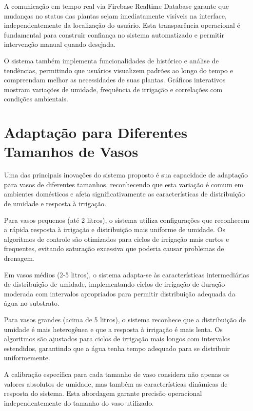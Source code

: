 \documentclass[twoside,english,brazilian]{UNISINOSmonografia}
\begin{document}
A comunicação em tempo real via Firebase Realtime Database garante que mudanças no status das plantas sejam imediatamente visíveis na interface, independentemente da localização do usuário. Esta transparência operacional é fundamental para construir confiança no sistema automatizado e permitir intervenção manual quando desejada.

O sistema também implementa funcionalidades de histórico e análise de tendências, permitindo que usuários visualizem padrões ao longo do tempo e compreendam melhor as necessidades de suas plantas. Gráficos interativos mostram variações de umidade, frequência de irrigação e correlações com condições ambientais.

\section{Adaptação para Diferentes Tamanhos de Vasos}

Uma das principais inovações do sistema proposto é sua capacidade de adaptação para vasos de diferentes tamanhos, reconhecendo que esta variação é comum em ambientes domésticos e afeta significativamente as características de distribuição de umidade e resposta à irrigação.

Para vasos pequenos (até 2 litros), o sistema utiliza configurações que reconhecem a rápida resposta à irrigação e distribuição mais uniforme de umidade. Os algoritmos de controle são otimizados para ciclos de irrigação mais curtos e frequentes, evitando saturação excessiva que poderia causar problemas de drenagem.

Em vasos médios (2-5 litros), o sistema adapta-se às características intermediárias de distribuição de umidade, implementando ciclos de irrigação de duração moderada com intervalos apropriados para permitir distribuição adequada da água no substrato.

Para vasos grandes (acima de 5 litros), o sistema reconhece que a distribuição de umidade é mais heterogênea e que a resposta à irrigação é mais lenta. Os algoritmos são ajustados para ciclos de irrigação mais longos com intervalos estendidos, garantindo que a água tenha tempo adequado para se distribuir uniformemente.

A calibração específica para cada tamanho de vaso considera não apenas os valores absolutos de umidade, mas também as características dinâmicas de resposta do sistema. Esta abordagem garante precisão operacional independentemente do tamanho do vaso utilizado.
\end{document}
